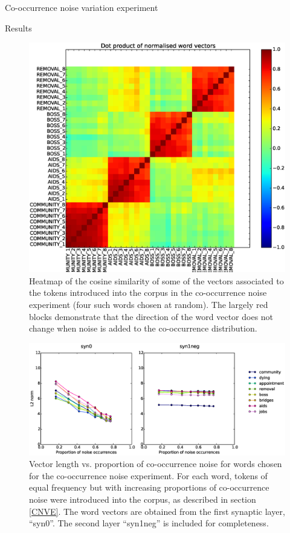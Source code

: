 \documentclass{article} %
\begin{document}
\begin{section}{Co-occurrence noise variation experiment}
\begin{subsection}{Results}
\begin{figure}\label{fig:co-occurrence-noise-heatmap}
	\includegraphics[scale=0.5]{cooccurrence-noise-heatmap}
	\caption{
	Heatmap of the cosine similarity of some of the vectors associated to the
	tokens introduced into the corpus in the co-occurrence noise experiment
	(four such words chosen at random).  The
	largely red blocks demonstrate that the direction of the word vector
	does not change when noise is added to the co-occurrence distribution.
	}
\end{figure}

\begin{figure}\label{fig:co-occurrence-noise-graph}
	\includegraphics[scale=0.6]{cooccurrence-noise-graph}
	\caption{
	Vector length vs. proportion of co-occurrence noise for words
	chosen for the co-occurrence noise experiment.  For each word,
	tokens of equal frequency but with increasing proportions of
	co-occurrence noise were introduced into the corpus, as
	described in section \ref{CNVE}.
	The word vectors are obtained from the first synaptic layer, ``syn0''.
	The second layer ``syn1neg'' is included for completeness.
	}
\end{figure}

\end{subsection}

\end{section}
\end{document}
